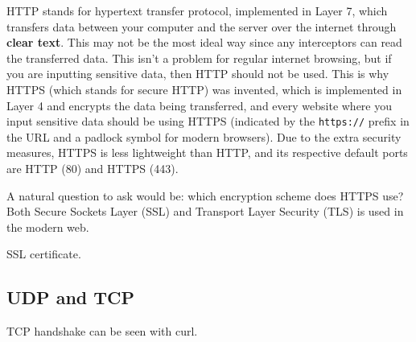 \documentclass{article}
\newcounter{question}[section]
\begin{document}
    HTTP stands for hypertext transfer protocol, implemented in Layer 7, which transfers data between your computer and the server over the internet through \textbf{clear text}. This may not be the most ideal way since any interceptors can read the transferred data. This isn't a problem for regular internet browsing, but if you are inputting sensitive data, then HTTP should not be used. This is why HTTPS (which stands for secure HTTP) was invented, which  is implemented in Layer 4 and encrypts the data being transferred, and every website where you input sensitive data should be using HTTPS (indicated by the \texttt{https://} prefix in the URL and a padlock symbol for modern browsers). Due to the extra security measures, HTTPS is less lightweight than HTTP, and its respective default ports are HTTP (80) and HTTPS (443).  

    A natural question to ask would be: which encryption scheme does HTTPS use? Both Secure Sockets Layer (SSL) and Transport Layer Security (TLS) is used in the modern web. 

    SSL certificate. 

  \subsection{UDP and TCP}

    TCP handshake can be seen with curl. 
\end{document}
